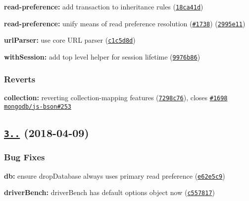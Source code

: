 \begin{DoxyItemize}
\item {\bfseries read-\/preference\+:} add transaction to inheritance rules (\href{https://github.com/mongodb/node-mongodb-native/commit/18ca41d}{\tt 18ca41d})
\item {\bfseries read-\/preference\+:} unify means of read preference resolution (\href{https://github.com/mongodb/node-mongodb-native/issues/1738}{\tt \#1738}) (\href{https://github.com/mongodb/node-mongodb-native/commit/2995e11}{\tt 2995e11})
\item {\bfseries url\+Parser\+:} use core U\+RL parser (\href{https://github.com/mongodb/node-mongodb-native/commit/c1c5d8d}{\tt c1c5d8d})
\item {\bfseries with\+Session\+:} add top level helper for session lifetime (\href{https://github.com/mongodb/node-mongodb-native/commit/9976b86}{\tt 9976b86})
\end{DoxyItemize}

\subsubsection*{Reverts}


\begin{DoxyItemize}
\item {\bfseries collection\+:} reverting collection-\/mapping features (\href{https://github.com/mongodb/node-mongodb-native/commit/7298c76}{\tt 7298c76}), closes \href{https://github.com/mongodb/node-mongodb-native/issues/1698}{\tt \#1698} \href{https://github.com/mongodb/js-bson/issues/253}{\tt mongodb/js-\/bson\#253}
\end{DoxyItemize}

\label{_3.0.6}%
 \subsection*{\href{https://github.com/mongodb/node-mongodb-native/compare/v3.0.5...v3.0.6}{\tt 3..} (2018-\/04-\/09)}

\subsubsection*{Bug Fixes}


\begin{DoxyItemize}
\item {\bfseries db\+:} ensure {\ttfamily drop\+Database} always uses primary read preference (\href{https://github.com/mongodb/node-mongodb-native/commit/e62e5c9}{\tt e62e5c9})
\item {\bfseries driver\+Bench\+:} driver\+Bench has default options object now (\href{https://github.com/mongodb/node-mongodb-native/commit/c557817}{\tt c557817})
\end{DoxyItemize}

